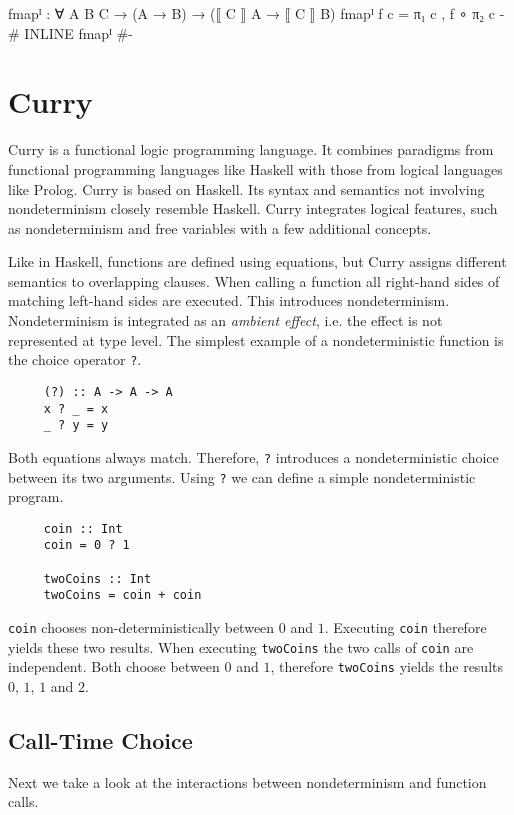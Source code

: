 \begin{code}
fmapᴵ : ∀ {A B C} → (A → B) → (⟦ C ⟧ A → ⟦ C ⟧ B)
fmapᴵ f c = π₁ c , f ∘ π₂ c
{-# INLINE fmapᴵ #-}
\end{code}


\section{Curry}
\label{preliminaries:curry}

Curry \cite{Hanus95curry} is a functional logic programming language.
It combines paradigms from functional programming languages like Haskell
with those from logical languages like Prolog.
Curry is based on Haskell.
Its syntax and semantics not involving nondeterminism closely resemble Haskell.
Curry integrates logical features, such as nondeterminism and free variables
with a few additional concepts.

Like in Haskell, functions are defined using equations, but Curry assigns
different semantics to overlapping clauses.
When calling a function all right-hand sides of matching left-hand sides are
executed.
This introduces nondeterminism.
Nondeterminism is integrated as an \textit{ambient effect}, i.e. the effect is
not represented at type level.
The simplest example of a nondeterministic function is the choice operator
\texttt{?}.

\begin{verbatim}
     (?) :: A -> A -> A
     x ? _ = x
     _ ? y = y
\end{verbatim}
Both equations always match.
Therefore, \texttt{?} introduces a nondeterministic choice between its two
arguments.
Using \texttt{?} we can define a simple nondeterministic program.

\begin{verbatim}
     coin :: Int
     coin = 0 ? 1

     twoCoins :: Int
     twoCoins = coin + coin
\end{verbatim}
\texttt{coin} chooses non-deterministically between $0$ and $1$.
Executing \texttt{coin} therefore yields these two results.
When executing \texttt{twoCoins} the two calls of \texttt{coin} are independent.
Both choose between $0$ and $1$, therefore \texttt{twoCoins} yields the results
$0$, $1$, $1$ and $2$.

\subsection{Call-Time Choice}
\label{call-time-choice}
Next we take a look at the interactions between nondeterminism and function
calls.

